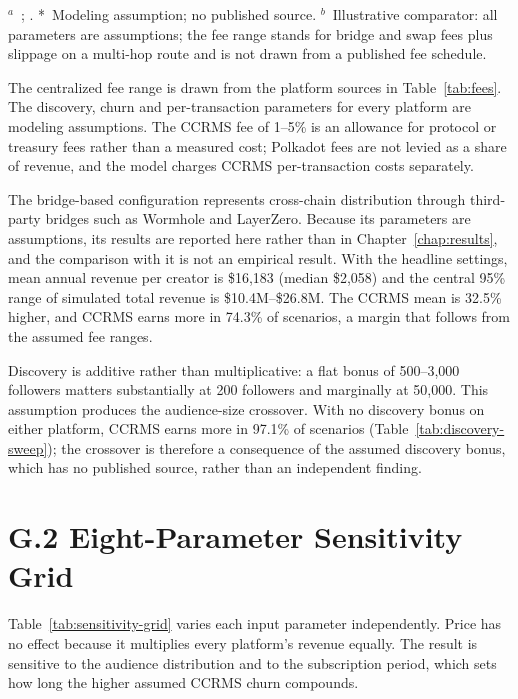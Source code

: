 {\footnotesize $^a$~\citet{binanceResearch2023}; \citet{theBlock2024}. *~Modeling assumption; no published source. $^b$~Illustrative comparator: all parameters are assumptions; the fee range stands for bridge and swap fees plus slippage on a multi-hop route and is not drawn from a published fee schedule.}

The centralized fee range is drawn from the platform sources in Table~\ref{tab:fees}. The discovery, churn and per-transaction parameters for every platform are modeling assumptions. The CCRMS fee of 1--5\% is an allowance for protocol or treasury fees rather than a measured cost; Polkadot fees are not levied as a share of revenue, and the model charges CCRMS per-transaction costs separately.

The bridge-based configuration represents cross-chain distribution through third-party bridges such as Wormhole and LayerZero. Because its parameters are assumptions, its results are reported here rather than in Chapter~\ref{chap:results}, and the comparison with it is not an empirical result. With the headline settings, mean annual revenue per creator is \$16,183 (median \$2,058) and the central 95\% range of simulated total revenue is \$10.4M--\$26.8M. The CCRMS mean is 32.5\% higher, and CCRMS earns more in 74.3\% of scenarios, a margin that follows from the assumed fee ranges.

Discovery is additive rather than multiplicative: a flat bonus of 500--3,000 followers matters substantially at 200 followers and marginally at 50,000. This assumption produces the audience-size crossover. With no discovery bonus on either platform, CCRMS earns more in 97.1\% of scenarios (Table~\ref{tab:discovery-sweep}); the crossover is therefore a consequence of the assumed discovery bonus, which has no published source, rather than an independent finding.

\section*{G.2 Eight-Parameter Sensitivity Grid}

Table~\ref{tab:sensitivity-grid} varies each input parameter independently. Price has no effect because it multiplies every platform's revenue equally. The result is sensitive to the audience distribution and to the subscription period, which sets how long the higher assumed CCRMS churn compounds.

